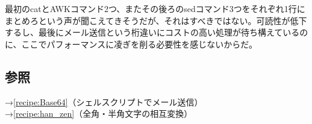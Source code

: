 最初のcatとAWKコマンド2つ、またその後ろのsedコマンド3つをそれぞれ1行にまとめろという声が聞こえてきそうだが、それはすべきではない。可読性が低下するし、最後にメール送信という桁違いにコストの高い処理が待ち構えているのに、ここでパフォーマンスに凌ぎを削る必要性を感じないからだ。


\subsection*{参照}

\noindent
→\ref{recipe:Base64}（シェルスクリプトでメール送信）\\
→\ref{recipe:han_zen}（全角・半角文字の相互変換）

